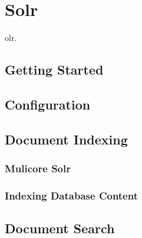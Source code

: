 \chapter{Solr}\label{chap:solr}

olr.

\section{Getting Started}


\section{Configuration}

\section{Document Indexing}

\subsection{Mulicore Solr}

\subsection{Indexing Database Content}

\section{Document Search}

